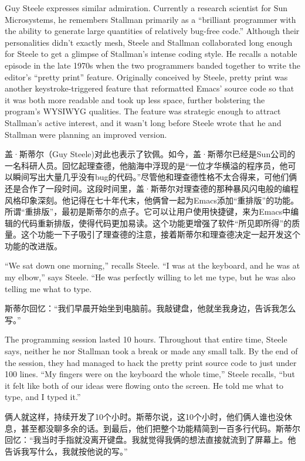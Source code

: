 \ifdefined\eng
Guy Steele expresses similar admiration. Currently a research scientist for Sun Microsystems, he remembers Stallman primarily as a ``brilliant programmer with the ability to generate large quantities of relatively bug-free code.'' Although their personalities didn't exactly mesh, Steele and Stallman collaborated long enough for Steele to get a glimpse of Stallman's intense coding style. He recalls a notable episode in the late 1970s when the two programmers banded together to write the editor's ``pretty print'' feature. Originally conceived by Steele, pretty print was another keystroke-triggered feature that reformatted Emacs' source code so that it was both more readable and took up less space, further bolstering the program's WYSIWYG qualities. The feature was strategic enough to attract Stallman's active interest, and it wasn't long before Steele wrote that he and Stallman were planning an improved version.
\fi

\ifdefined\chs
盖·斯蒂尔（Guy Steele)对此也表示了钦佩。如今，盖·斯蒂尔已经是Sun公司的一名科研人员。回忆起理查德，他脑海中浮现的是“一位才华横溢的程序员，他可以瞬间写出大量几乎没有bug的代码。”尽管他和理查德性格不太合得来，可他们俩还是合作了一段时间。这段时间里，盖·斯蒂尔对理查德的那种暴风闪电般的编程风格印象深刻。他记得在七十年代末，他俩曾一起为Emacs添加“重排版”的功能。所谓“重排版”，最初是斯蒂尔的点子。它可以让用户使用快捷键，来为Emacs中编辑的代码重新排版，使得代码更加易读。这个功能更增强了软件“所见即所得”的质量。这个功能一下子吸引了理查德的注意，接着斯蒂尔和理查德决定一起开发这个功能的改进版。
\fi

\ifdefined\eng
``We sat down one morning,'' recalls Steele. ``I was at the keyboard, and he was at my elbow,'' says Steele. ``He was perfectly willing to let me type, but he was also telling me what to type.
\fi

\ifdefined\chs
斯蒂尔回忆：“我们早晨开始坐到电脑前。我敲键盘，他就坐我身边，告诉我怎么写。”
\fi

\ifdefined\eng
The programming session lasted 10 hours. Throughout that entire time, Steele says, neither he nor Stallman took a break or made any small talk. By the end of the session, they had managed to hack the pretty print source code to just under 100 lines. ``My fingers were on the keyboard the whole time,'' Steele recalls, ``but it felt like both of our ideas were flowing onto the screen. He told me what to type, and I typed it.''
\fi

\ifdefined\chs
俩人就这样，持续开发了10个小时。斯蒂尔说，这10个小时，他们俩人谁也没休息，甚至都没聊多余的话。到最后，他们把整个功能精简到一百多行代码。斯蒂尔回忆：“我当时手指就没离开键盘。我就觉得我俩的想法直接就流到了屏幕上。他告诉我写什么，我就按他说的写。”
\fi

